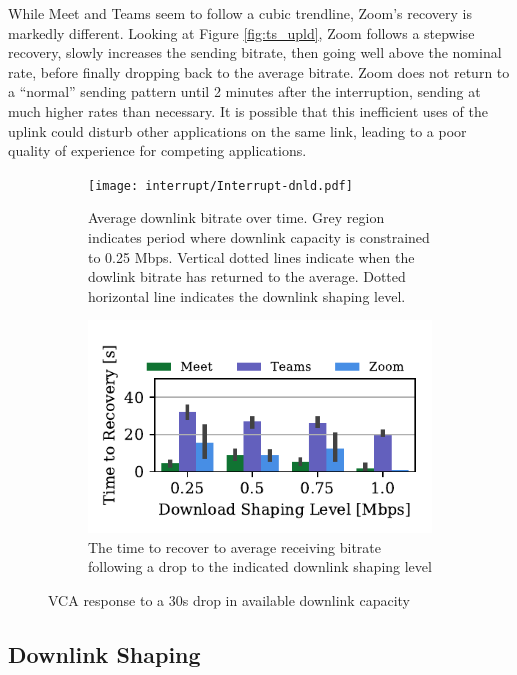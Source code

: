 While Meet and Teams seem to follow a cubic trendline, Zoom's recovery is markedly different. Looking at Figure \ref{fig:ts_upld}, Zoom follows a stepwise recovery, slowly increases the sending bitrate, then going well above the nominal rate, before finally dropping back to the average bitrate. Zoom does not return to a ``normal'' sending pattern until 2 minutes after the interruption, sending at much higher rates than necessary. It is possible that this inefficient uses of the uplink could disturb other applications on the same link, leading to a poor quality of experience for competing applications. 
\begin{figure}[t!]
 \centering
\begin{subfigure}[t]{.45\textwidth}
   \centering
    \texttt{[image: interrupt/Interrupt-dnld.pdf]}
    \caption{Average downlink bitrate over time. Grey region indicates period where downlink capacity is constrained to 0.25 Mbps. Vertical dotted lines indicate when the dowlink bitrate has returned to the average. Dotted horizontal line indicates the downlink shaping level.}
    \label{fig:ts-dnld}
\end{subfigure}
\begin{subfigure}[t]{.45\textwidth}
  \centering
    \includegraphics[width=.75\textwidth,keepaspectratio]{../figures/interrupt/TTR-dnld.pdf}
    \caption{The time to recover to average receiving bitrate following a drop to the indicated downlink shaping level}
    \label{fig:TTR_dnld}
\end{subfigure}
\caption{VCA response to a 30s drop in available downlink capacity}
\label{fig:interrupt-dnld}
\end{figure}

\subsection{Downlink Shaping}

